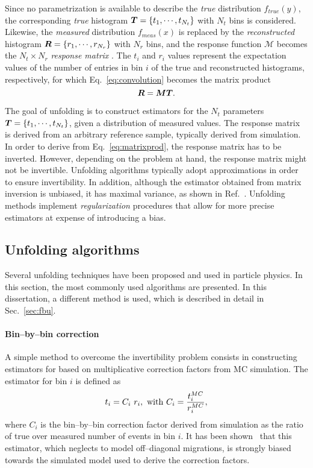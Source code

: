 Since no parametrization is available to describe the {\it true}
distribution $f_{true}(y)$, the corresponding {\it true} histogram
$\boldsymbol{T}{}=\{t_1,\cdots{},t_{N_t}\}$ with $N_t$ bins is
considered. Likewise, the {\it measured} distribution $f_{meas}(x)$ is
replaced by the {\it reconstructed} histogram $\boldsymbol{R}{}=\{r_1,\cdots{},r_{N_r}\}$ with
$N_r$ bins, and the response function $\mathcal{M}$ becomes the $N_t\times N_r$ {\it
  response matrix} \TrasfMatrix{}.
The $t_i$ and $r_i$ values represent the expectation values of the number of
entries in bin $i$ of the true and reconstructed histograms,
respectively, for which Eq.~\ref{eq:convolution} becomes the matrix product
\begin{equation}
\label{eq:matrixprod}
\boldsymbol{R}{} = \boldsymbol{M}{}\boldsymbol{T}{}.
\end{equation}

The goal of unfolding is to construct estimators for the $N_t$
parameters $\boldsymbol{T}{}=\{t_1,\cdots{},t_{N_t}\}$, given a distribution
\Reco{} of measured values. The response matrix \TrasfMatrix{} is derived from
an arbitrary reference sample, typically derived from simulation.
In order to derive \Truth{} from Eq.~\ref{eq:matrixprod}, the response
matrix \TrasfMatrix{} has to be inverted. However, depending on the
problem at hand, the response matrix might not be
invertible. Unfolding algorithms typically adopt approximations in
order to ensure invertibility. In addition, although the estimator obtained from
matrix inversion is unbiased, it has maximal variance, as shown in
Ref.~\cite{Cowan:2002in}.
Unfolding methods implement {\it regularization} procedures
that allow for more precise estimators at expense of introducing a bias.

\subsection{Unfolding algorithms}

Several unfolding techniques have been proposed and used in particle
physics. In this section, the most commonly used algorithms are
presented. In this dissertation, a different method is used, which is
described in detail in Sec.~\ref{sec:fbu}.

\paragraph{Bin--by--bin correction}
A simple method to overcome the invertibility problem consists in
constructing estimators for \Truth{} based on multiplicative
correction factors from MC simulation. The estimator for bin $i$ is
defined as
\begin{equation}
t_i = C_i~r_i,~{\rm with}~C_i=\frac{t_i^{MC}}{r_i^{MC}},
\end{equation}
where $C_i$ is the bin--by--bin correction factor derived from
simulation as the ratio of true over measured number of events in bin $i$.
It has been shown~\cite{Cowan:2002in} that this estimator, which neglects
to model off--diagonal migrations, is strongly biased towards the
simulated model used to derive the correction factors. 
